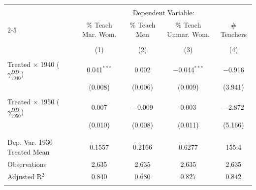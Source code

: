
\begin{tabular}{@{\extracolsep{5pt}}lcccc} 
\\[-1.8ex]\hline 
\hline \\[-1.8ex] 
 & \multicolumn{4}{c}{Dependent Variable:} \\ 
\cline{2-5} 
 & \% Teach Mar. Wom. & \% Teach Men & \% Teach Unmar. Wom. & \# Teachers \\ 
\\[-1.8ex] & (1) & (2) & (3) & (4)\\ 
\hline \\[-1.8ex] 
 Treated $\times$ 1940 ($\gamma_{1940}^{DD}$) & 0.041$^{***}$ & 0.002 & $-$0.044$^{***}$ & $-$0.916 \\ 
  & (0.008) & (0.006) & (0.009) & (3.941) \\ 
  & & & & \\ 
 Treated $\times$ 1950 ($\gamma_{1950}^{DD}$) & 0.007 & $-$0.009 & 0.003 & $-$2.872 \\ 
  & (0.010) & (0.008) & (0.011) & (5.166) \\ 
  & & & & \\ 
\hline \\[-1.8ex] 
Dep. Var. 1930 Treated Mean & 0.1557 & 0.2166 & 0.6277 & 155.4 \\ 
Observations & 2,635 & 2,635 & 2,635 & 2,635 \\ 
Adjusted R$^{2}$ & 0.840 & 0.680 & 0.827 & 0.842 \\ 
\hline 
\hline \\[-1.8ex] 
\end{tabular} 
